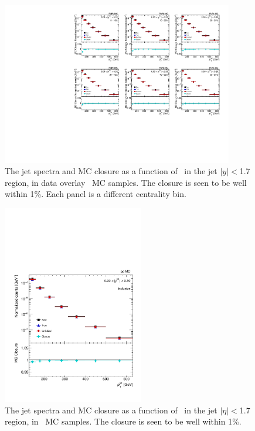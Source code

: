 \begin{figure}[ht]
\centering
\includegraphics[page=5, width=0.9\textwidth]{figures/main/corrections/spect_closure_PbPb_MC.pdf}
\caption{The jet spectra and MC closure as a function of \ptjet\ in the jet $|y| < $1.7 region, in data overlay \pbpb\ MC samples.
The closure is seen to be well within 1\%.
Each panel is a different centrality bin.}
\label{fig:PbPb_jetspect_closure}
\end{figure}

\begin{figure}[ht]
\centering
\includegraphics[page=5, width=0.55\textwidth]{figures/main/corrections/spect_closure_pp_MC.pdf}
\caption{The jet spectra and MC closure as a function of \ptjet\ in the jet $|\eta| < $1.7 region, in \pp\ MC samples.
The closure is seen to be well within 1\%.}
\label{fig:pp_jetspect_closure}
\end{figure}



